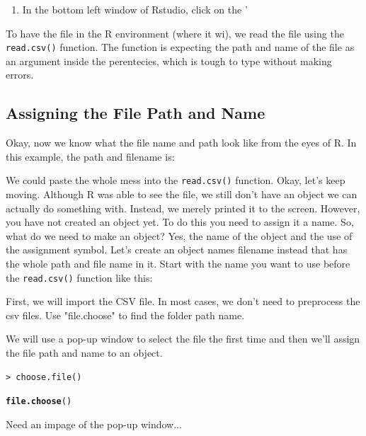\documentclass{article}\usepackage[]{graphicx}\usepackage[]{color}
\makeatletter
\newcommand{\hlstd}[1]{\textcolor[rgb]{0.345,0.345,0.345}{#1}}%
\newcommand{\hlkwd}[1]{\textcolor[rgb]{0.737,0.353,0.396}{\textbf{#1}}}%
\newenvironment{kframe}{%
 \def\at@end@of@kframe{}%
 \ifinner\ifhmode%
  \def\at@end@of@kframe{\end{minipage}}%
  \begin{minipage}{\columnwidth}%
 \fi\fi%
 \def\FrameCommand##1{\hskip\@totalleftmargin \hskip-\fboxsep
 \colorbox{shadecolor}{##1}\hskip-\fboxsep
     \hskip-\linewidth \hskip-\@totalleftmargin \hskip\columnwidth}%
 \MakeFramed {\advance\hsize-\width
   \@totalleftmargin\z@ \linewidth\hsize
   \@setminipage}}%
 {\par\unskip\endMakeFramed%
 \at@end@of@kframe}
\newenvironment{knitrout}{}{} %
\makeatother
\begin{document}
  \begin{enumerate}
  \item In the bottom left window of Rstudio, click on the '
  \end{enumerate}
To have the file in the R environment (where it wi), we read the file using the \verb!read.csv()! function. The function is expecting the path and name of the file as an argument inside the perentecies, which is tough to type without making errors. 

\subsection{Assigning the File Path and Name}

Okay, now we know what the file name and path look like from the eyes of R. In this example, the path and filename is:


We could paste the whole mess into the \texttt{read.csv()} function. Okay, let's keep moving. Although R was able to see the file, we still don't have an object we can actually do something with. Instead, we merely printed it to the screen. However, you have not created an object yet. To do this you need to assign it a name. So, what do we need to make an object?  Yes, the name of the object and the use of the assignment symbol. Let's create an object names filename instead that has the whole path and file name in it. Start with the name you want to use before the \texttt{read.csv()} function like this:

First, we will import the CSV file. In most cases, we don't need to preprocess the csv files. Use "file.choose" to find the folder path name. 

We will use a pop-up window to select the file the first time and then we'll assign the file path and name to an object. 

\begin{verbatim}
> choose.file()
\end{verbatim}


\begin{knitrout}
\color{fgcolor}\begin{kframe}
\begin{alltt}
\hlkwd{file.choose}\hlstd{()}
\end{alltt}
\end{kframe}
\end{knitrout}
Need an impage of the pop-up window...
\end{document}
